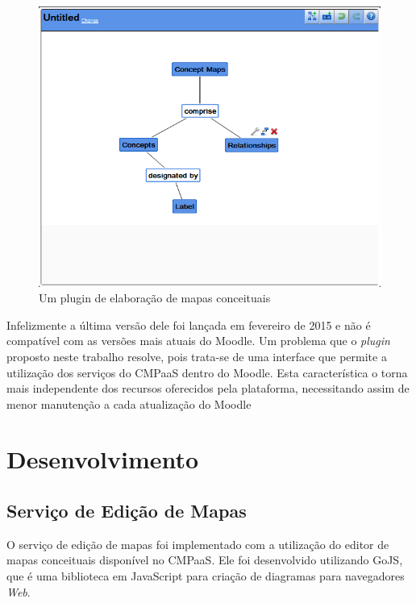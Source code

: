 \documentclass[
	12pt,				%
	openright,			%
	oneside,			%
	a4paper,			%
	english,			%
	french,				%
	spanish,			%
	brazil				%
	]{abntex2}
\begin{document}
\begin{figure}[htb]
	\caption{\label{fig_outroplugin} Um plugin de elaboração de mapas conceituais}
	\begin{center}
		\includegraphics[scale=0.4]{outroplugin.png}
	\end{center}
\end{figure} 


Infelizmente a última versão dele foi lançada em fevereiro de 2015 e não é compatível com as versões mais atuais do Moodle. Um problema que o \textit{plugin} proposto neste trabalho resolve, pois trata-se de uma interface que permite a utilização dos serviços do CMPaaS dentro do Moodle. Esta característica o torna mais independente dos recursos oferecidos pela plataforma, necessitando assim de menor manutenção a cada atualização do Moodle  



\chapter{Desenvolvimento}

\section{Serviço de Edição de Mapas}
O serviço de edição de mapas foi implementado com a utilização do editor de mapas conceituais disponível no CMPaaS. Ele foi desenvolvido utilizando GoJS, que é uma biblioteca em JavaScript para criação de diagramas para navegadores \textit{Web}.
\end{document}
